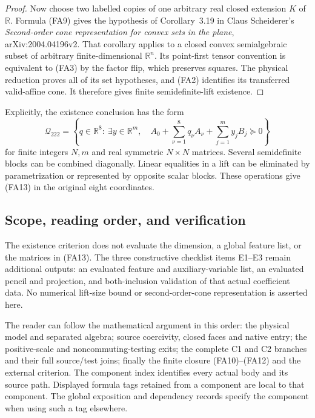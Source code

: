 \begin{proof}
Now choose two labelled copies of one arbitrary real closed extension
$K$ of $\mathbb R$.  Formula (FA9) gives the hypothesis of
Corollary~3.19 in Claus Scheiderer's
\emph{Second-order cone representation for convex sets in the plane},
arXiv:2004.04196v2.  That corollary applies to a closed convex
semialgebraic subset of arbitrary finite-dimensional $\mathbb R^n$.
Its point-first tensor convention is equivalent to (FA3) by the factor
flip, which preserves squares.  The physical reduction proves all of
its set hypotheses, and (FA2) identifies its transferred valid-affine
cone.  It therefore gives finite semidefinite-lift existence.
\end{proof}

Explicitly, the existence conclusion has the form
\[
 \mathcal Q_{222}=
 \left\{q\in\mathbb R^8:\ \exists y\in\mathbb R^m,\quad
 A_0+\sum_{\nu=1}^8q_\nu A_\nu+\sum_{j=1}^m y_jB_j\succeq0\right\}
                                                               \tag{FA13}
\]
for finite integers $N,m$ and real symmetric $N\times N$ matrices.
Several semidefinite blocks can be combined diagonally.  Linear
equalities in a lift can be eliminated by parametrization or represented
by opposite scalar blocks.  These operations give (FA13) in the
original eight coordinates.

\subsection*{Scope, reading order, and verification}

The existence criterion does not evaluate the dimension, a global
feature list, or the matrices in (FA13).  The three constructive
checklist items E1--E3 remain additional outputs: an evaluated feature
and auxiliary-variable list, an evaluated pencil and projection, and
both-inclusion validation of that actual coefficient data.  No numerical
lift-size bound or second-order-cone representation is asserted here.

The reader can follow the mathematical argument in this order:
the physical model and separated algebra; source coercivity, closed
faces and native entry; the positive-scale and noncommuting-testing
exits; the complete C1 and C2 branches and their full source/test
joins; finally the finite closure (FA10)--(FA12) and the external
criterion.  The component index identifies every actual body and
its source path.  Displayed formula tags retained from a component
are local to that component.  The global exposition and dependency
records specify the component when using such a tag elsewhere.

